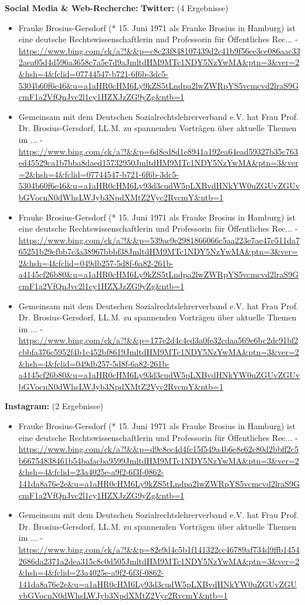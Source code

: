 \documentclass[12pt,a4paper]{article}
\begin{document}
\textbf{Social Media \& Web-Recherche:}
\textbf{Twitter:} (4 Ergebnisse)
\begin{itemize}
\item Frauke Brosius-Gersdorf (* 15. Juni 1971 als Frauke Brosius in Hamburg) ist eine deutsche Rechtswissenschaftlerin und Professorin für Öffentliches Rec... - \url{https://www.bing.com/ck/a?!&&p=c8c23f848107439d2c41b9f56ee3ce086aac332aea05d4d596a3658c7a5e7d9aJmltdHM9MTc1NDY5NzYwMA&ptn=3&ver=2&hsh=4&fclid=07744547-b721-6f6b-3dc5-5304b60f6e46&u=a1aHR0cHM6Ly9kZS5tLndpa2lwZWRpYS5vcmcvd2lraS9GcmF1a2VfQnJvc2l1cy1HZXJzZG9yZg&ntb=1}
\item Gemeinsam mit dem Deutschen Sozialrechtslehrerverband e.V. hat Frau Prof. Dr. Brosius-Gersdorf, LL.M. zu spannenden Vorträgen über aktuelle Themen im ... - \url{https://www.bing.com/ck/a?!&&p=6d8ed8d1e8941a192ea64ead59327b35c763ed45529ca1b7bba8daed15732950JmltdHM9MTc1NDY5NzYwMA&ptn=3&ver=2&hsh=4&fclid=07744547-b721-6f6b-3dc5-5304b60f6e46&u=a1aHR0cHM6Ly93d3cudW5pLXBvdHNkYW0uZGUvZGUvbGVocnN0dWhsLWJyb3NpdXMtZ2Vyc2RvcmY&ntb=1}
\item Frauke Brosius-Gersdorf (* 15. Juni 1971 als Frauke Brosius in Hamburg) ist eine deutsche Rechtswissenschaftlerin und Professorin für Öffentliches Rec... - \url{https://www.bing.com/ck/a?!&&p=539ae9e2981866066c5aa223e7ae47e511da765251b29efbb7c3a38967bbbf38JmltdHM9MTc1NDY5NzYwMA&ptn=3&ver=2&hsh=4&fclid=049db257-5d8f-6a82-261b-a4145cf26b80&u=a1aHR0cHM6Ly9kZS5tLndpa2lwZWRpYS5vcmcvd2lraS9GcmF1a2VfQnJvc2l1cy1HZXJzZG9yZg&ntb=1}
\item Gemeinsam mit dem Deutschen Sozialrechtslehrerverband e.V. hat Frau Prof. Dr. Brosius-Gersdorf, LL.M. zu spannenden Vorträgen über aktuelle Themen im ... - \url{https://www.bing.com/ck/a?!&&p=177e2d4c4ed3a0fe32cdaa569e6bc2dc91bf2cbbfa376c5952f4b1c452bf8619JmltdHM9MTc1NDY5NzYwMA&ptn=3&ver=2&hsh=4&fclid=049db257-5d8f-6a82-261b-a4145cf26b80&u=a1aHR0cHM6Ly93d3cudW5pLXBvdHNkYW0uZGUvZGUvbGVocnN0dWhsLWJyb3NpdXMtZ2Vyc2RvcmY&ntb=1}
\end{itemize}

\textbf{Instagram:} (2 Ergebnisse)
\begin{itemize}
\item Frauke Brosius-Gersdorf (* 15. Juni 1971 als Frauke Brosius in Hamburg) ist eine deutsche Rechtswissenschaftlerin und Professorin für Öffentliches Rec... - \url{https://www.bing.com/ck/a?!&&p=d9c8cc4d4fc15f549a4b6e8e62c80d2bbff2c5b66754838461b54bafacba9599JmltdHM9MTc1NDY5NzYwMA&ptn=3&ver=2&hsh=4&fclid=23a4025e-a9f2-6f3f-0862-141da8a76e2e&u=a1aHR0cHM6Ly9kZS5tLndpa2lwZWRpYS5vcmcvd2lraS9GcmF1a2VfQnJvc2l1cy1HZXJzZG9yZg&ntb=1}
\item Gemeinsam mit dem Deutschen Sozialrechtslehrerverband e.V. hat Frau Prof. Dr. Brosius-Gersdorf, LL.M. zu spannenden Vorträgen über aktuelle Themen im ... - \url{https://www.bing.com/ck/a?!&&p=82e9d4c5b1f141322cc46789af734d9ffb14542686da2371a2dea315c8c0d505JmltdHM9MTc1NDY5NzYwMA&ptn=3&ver=2&hsh=4&fclid=23a4025e-a9f2-6f3f-0862-141da8a76e2e&u=a1aHR0cHM6Ly93d3cudW5pLXBvdHNkYW0uZGUvZGUvbGVocnN0dWhsLWJyb3NpdXMtZ2Vyc2RvcmY&ntb=1}
\end{itemize}
\end{document}
